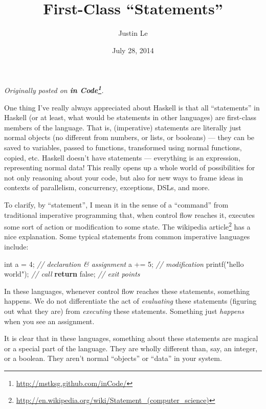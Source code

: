 \documentclass[]{article}
\title{First-Class ``Statements''}
\author{Justin Le}
\date{July 28, 2014}
\newenvironment{Shaded}{}{}
\newcommand{\KeywordTok}[1]{\textcolor[rgb]{0.00,0.44,0.13}{\textbf{{#1}}}}
\newcommand{\DataTypeTok}[1]{\textcolor[rgb]{0.56,0.13,0.00}{{#1}}}
\newcommand{\DecValTok}[1]{\textcolor[rgb]{0.25,0.63,0.44}{{#1}}}
\newcommand{\StringTok}[1]{\textcolor[rgb]{0.25,0.44,0.63}{{#1}}}
\newcommand{\CommentTok}[1]{\textcolor[rgb]{0.38,0.63,0.69}{\textit{{#1}}}}
\newcommand{\NormalTok}[1]{{#1}}
\renewcommand{\href}[2]{#2\footnote{\url{#1}}}
\begin{document}
\maketitle

\emph{Originally posted on
\textbf{\href{http://mstksg.github.com/inCode/}{in Code}}.}

One thing I've really always appreciated about Haskell is that all
``statements'' in Haskell (or at least, what would be statements in
other languages) are first-class members of the language. That is,
(imperative) statements are literally just normal objects (no different
from numbers, or lists, or booleans) --- they can be saved to variables,
passed to functions, transformed using normal functions, copied, etc.
Haskell doesn't have statements --- everything is an expression,
representing normal data! This really opens up a whole world of
possibilities for not only reasoning about your code, but also for new
ways to frame ideas in contexts of parallelism, concurrency, exceptions,
DSLs, and more.

To clarify, by ``statement'', I mean it in the sense of a ``command''
from traditional imperative programming that, when control flow reaches
it, executes some sort of action or modification to some state. The
\href{http://en.wikipedia.org/wiki/Statement_(computer_science)}{wikipedia
article} has a nice explanation. Some typical statements from common
imperative languages include:

\begin{Shaded}
\begin{Highlighting}[]
\DataTypeTok{int} \NormalTok{a = }\DecValTok{4}\NormalTok{;              }\CommentTok{// declaration & assignment}
\NormalTok{a += }\DecValTok{5}\NormalTok{;                 }\CommentTok{// modification}
\NormalTok{printf(}\StringTok{"hello world"}\NormalTok{);  }\CommentTok{// call}
\KeywordTok{return} \NormalTok{false;           }\CommentTok{// exit points}
\end{Highlighting}
\end{Shaded}

In these languages, whenever control flow reaches these statements,
something happens. We do not differentiate the act of \emph{evaluating}
these statements (figuring out what they are) from \emph{executing}
these statements. Something just \emph{happens} when you see an
assignment.

It is clear that in these languages, something about these statements
are magical or a special part of the language. They are wholly different
than, say, an integer, or a boolean. They aren't normal ``objects'' or
``data'' in your system.
\end{document}
